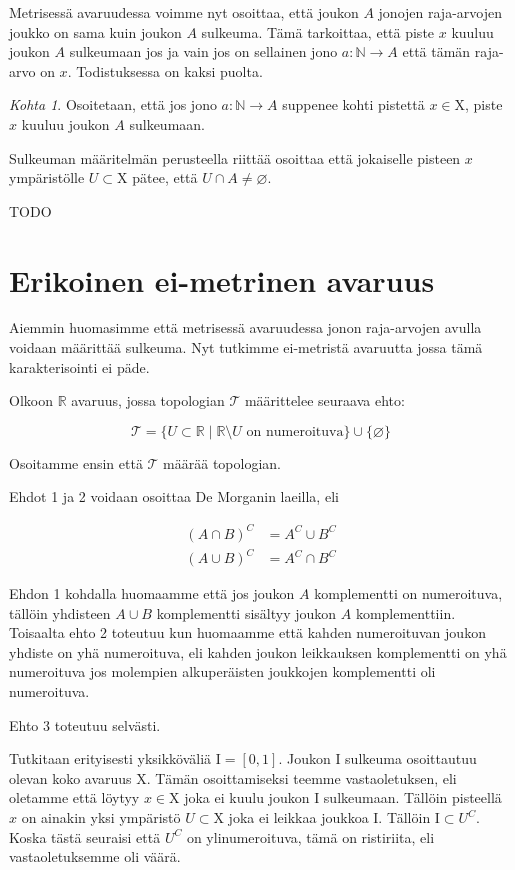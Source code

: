 \documentclass[12pt,a4paper,leqno]{report}
\newcommand{\R}{\mathbb{R}}
\newcommand{\N}{\mathbb{N}}
\newcommand{\X}{\mathrm{X}}
\newcommand{\T}{\mathcal{T}}
\newcommand{\I}{\mathrm{I}}
\theoremstyle{plain}
\theoremstyle{definition}
\theoremstyle{remark}
\begin{document}
Metrisessä avaruudessa voimme nyt osoittaa, että joukon $A$ jonojen raja-arvojen joukko on sama kuin joukon $A$ sulkeuma. Tämä tarkoittaa, että piste $x$ kuuluu joukon $A$ sulkeumaan jos ja vain jos on sellainen jono $a : \N \to A$ että tämän raja-arvo on $x$. Todistuksessa on kaksi puolta.

\emph{Kohta 1}. Osoitetaan, että jos jono $a : \N \to A$ suppenee kohti pistettä $x \in \X$, piste $x$ kuuluu joukon $A$ sulkeumaan.

Sulkeuman määritelmän perusteella riittää osoittaa että jokaiselle pisteen $x$ ympäristölle $U \subset \X$ pätee, että $U \cap A \not= \varnothing$.

TODO

\chapter{Erikoinen ei-metrinen avaruus}
Aiemmin huomasimme että metrisessä avaruudessa jonon raja-arvojen avulla voidaan määrittää sulkeuma. Nyt tutkimme ei-metristä avaruutta jossa tämä karakterisointi ei päde.

Olkoon $\R$ avaruus, jossa topologian $\T$ määrittelee seuraava ehto:

\begin{equation}
\T = \{U \subset \R \mid \R \setminus U \text{ on numeroituva} \} \cup \{ \varnothing \}
\end{equation}

Osoitamme ensin että $\T$ määrää topologian.

Ehdot 1 ja 2 voidaan osoittaa De Morganin laeilla, eli 

\begin{align}
(A \cap B)^C &= A^C \cup B^C \\
(A \cup B)^C &= A^C \cap B^C
\end{align}

Ehdon 1 kohdalla huomaamme että jos joukon $A$ komplementti on numeroituva, tällöin yhdisteen $A \cup B$ komplementti sisältyy joukon $A$ komplementtiin. Toisaalta ehto 2 toteutuu kun huomaamme että kahden numeroituvan joukon yhdiste on yhä numeroituva, eli kahden joukon leikkauksen komplementti on yhä numeroituva jos molempien alkuperäisten joukkojen komplementti oli numeroituva.

Ehto 3 toteutuu selvästi.

Tutkitaan erityisesti yksikköväliä $\I = [0,1]$. Joukon $\I$ sulkeuma osoittautuu olevan koko avaruus $\X$. Tämän osoittamiseksi teemme vastaoletuksen, eli oletamme että löytyy $x \in \X$ joka ei kuulu joukon $\I$ sulkeumaan. Tällöin pisteellä $x$ on ainakin yksi ympäristö $U \subset \X$ joka ei leikkaa joukkoa $\I$. Tällöin $\I \subset U^C$. Koska tästä seuraisi että $U^C$ on ylinumeroituva, tämä on ristiriita, eli vastaoletuksemme oli väärä.
\end{document}
